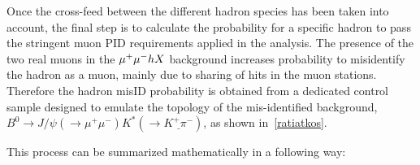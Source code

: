 Once the cross-feed between the different hadron species has been taken into account, the final step is to calculate the probability for
a specific hadron to pass the stringent muon \gls{PID} requirements applied in the analysis. The presence of the two real muons in the ${\mu^+\mu^-} h X$
background increases probability to misidentify the hadron as a muon, mainly due to sharing of hits in the muon stations. Therefore the hadron misID probability is obtained from a dedicated control sample designed to emulate the topology of the mis-identified background,
 $B^{0} \rightarrow J/\psi(\rightarrow \mu^{+} \mu^{-}) K^{*}(\rightarrow \underline{K^{+} \pi^{-}})$, as shown in~\autoref{ratiatkos}.


This process can be summarized mathematically in a following way:

